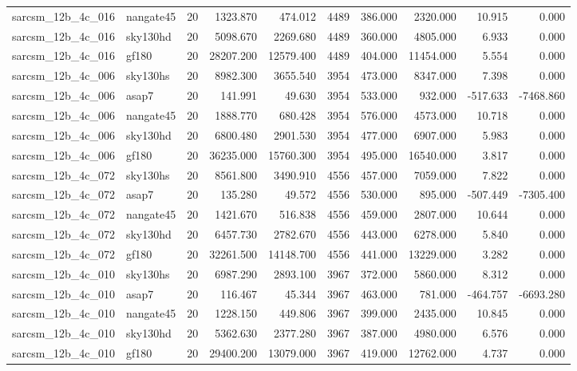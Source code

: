 \begin{tabular}{llrrrrrrrr}
sarcsm\_12b\_4c\_016 & nangate45 & 20 & 1323.870 & 474.012 & 4489 & 386.000 & 2320.000 & 10.915 & 0.000 \\
sarcsm\_12b\_4c\_016 & sky130hd & 20 & 5098.670 & 2269.680 & 4489 & 360.000 & 4805.000 & 6.933 & 0.000 \\
sarcsm\_12b\_4c\_016 & gf180 & 20 & 28207.200 & 12579.400 & 4489 & 404.000 & 11454.000 & 5.554 & 0.000 \\
sarcsm\_12b\_4c\_006 & sky130hs & 20 & 8982.300 & 3655.540 & 3954 & 473.000 & 8347.000 & 7.398 & 0.000 \\
sarcsm\_12b\_4c\_006 & asap7 & 20 & 141.991 & 49.630 & 3954 & 533.000 & 932.000 & -517.633 & -7468.860 \\
sarcsm\_12b\_4c\_006 & nangate45 & 20 & 1888.770 & 680.428 & 3954 & 576.000 & 4573.000 & 10.718 & 0.000 \\
sarcsm\_12b\_4c\_006 & sky130hd & 20 & 6800.480 & 2901.530 & 3954 & 477.000 & 6907.000 & 5.983 & 0.000 \\
sarcsm\_12b\_4c\_006 & gf180 & 20 & 36235.000 & 15760.300 & 3954 & 495.000 & 16540.000 & 3.817 & 0.000 \\
sarcsm\_12b\_4c\_072 & sky130hs & 20 & 8561.800 & 3490.910 & 4556 & 457.000 & 7059.000 & 7.822 & 0.000 \\
sarcsm\_12b\_4c\_072 & asap7 & 20 & 135.280 & 49.572 & 4556 & 530.000 & 895.000 & -507.449 & -7305.400 \\
sarcsm\_12b\_4c\_072 & nangate45 & 20 & 1421.670 & 516.838 & 4556 & 459.000 & 2807.000 & 10.644 & 0.000 \\
sarcsm\_12b\_4c\_072 & sky130hd & 20 & 6457.730 & 2782.670 & 4556 & 443.000 & 6278.000 & 5.840 & 0.000 \\
sarcsm\_12b\_4c\_072 & gf180 & 20 & 32261.500 & 14148.700 & 4556 & 441.000 & 13229.000 & 3.282 & 0.000 \\
sarcsm\_12b\_4c\_010 & sky130hs & 20 & 6987.290 & 2893.100 & 3967 & 372.000 & 5860.000 & 8.312 & 0.000 \\
sarcsm\_12b\_4c\_010 & asap7 & 20 & 116.467 & 45.344 & 3967 & 463.000 & 781.000 & -464.757 & -6693.280 \\
sarcsm\_12b\_4c\_010 & nangate45 & 20 & 1228.150 & 449.806 & 3967 & 399.000 & 2435.000 & 10.845 & 0.000 \\
sarcsm\_12b\_4c\_010 & sky130hd & 20 & 5362.630 & 2377.280 & 3967 & 387.000 & 4980.000 & 6.576 & 0.000 \\
sarcsm\_12b\_4c\_010 & gf180 & 20 & 29400.200 & 13079.000 & 3967 & 419.000 & 12762.000 & 4.737 & 0.000 \\

\end{tabular}
